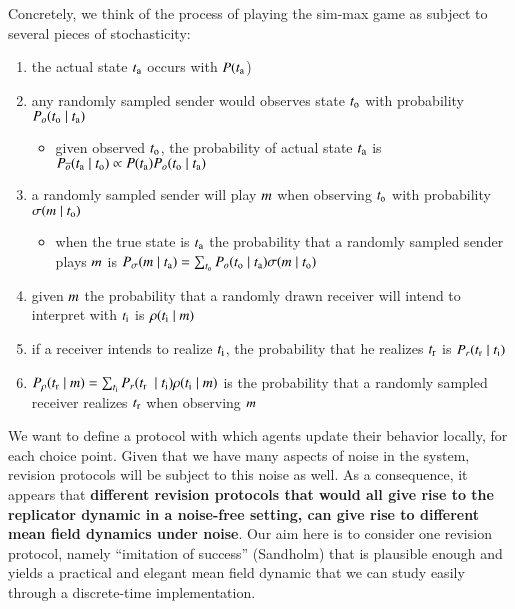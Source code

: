\documentclass[fleqn,reqno,11pt]{article}
\begin{document}
Concretely, we think of the process of playing the sim-max game as subject to several pieces of
stochasticity:
\begin{enumerate}
\item the actual state $t_{\mathrm{a}}$ occurs with $P(t_{\mathrm{a}}$)
\item any randomly sampled sender would observes state $t_{\mathrm{o}}$ with probability
  $P_o(t_{\mathrm{o}} \mid t_{\mathrm{a}})$
  \begin{itemize}
  \item given observed $t_{\mathrm{o}}$, the probability of actual state $t_{\mathrm{a}}$ is
    $P_{\overline{o}}(t_{\mathrm{a}} \mid t_{\mathrm{o}}) \propto P(t_{\mathrm{a}}) P_o(t_{\mathrm{o}}
    \mid t_{\mathrm{a}})$
  \end{itemize}
\item a randomly sampled sender will play $m$ when observing $t_{\mathrm{o}}$ with
  probability $\sigma(m \mid t_{\mathrm{o}})$
  \begin{itemize}
  \item when the true state is $t_{\mathrm{a}}$ the probability that a randomly sampled sender
    plays $m$ is $P_{\sigma}(m \mid t_{\mathrm{a}}) = \sum_{t_{\mathrm{o}}}
    P_o(t_{\mathrm{o}} \mid t_{\mathrm{a}}) \sigma(m \mid t_{\mathrm{o}})$
  \end{itemize}
\item given $m$ the probability that a randomly drawn receiver will intend to interpret
  with $t_{\mathrm{i}}$ is $\rho(t_{\mathrm{i}} \mid m)$
\item if a receiver intends to realize $t_{\mathrm{i}}$, the probability that he realizes
  $t_{\mathrm{r}}$ is $P_r(t_{\mathrm{r}} \mid t_{\mathrm{i}})$
\item $P_{\rho}(t_{\mathrm{r}} \mid m) = \sum_{t_{\mathrm{i}}} P_r(t_{\mathrm{r}} \ \mid
  t_{\mathrm{i}}) \rho(t_{\mathrm{i}} \mid m)$ is the probability that a randomly sampled
  receiver realizes $t_{\mathrm{r}}$ when observing $m$
\end{enumerate}

We want to define a protocol with which agents update their behavior locally, for each choice
point. Given that we have many aspects of noise in the system, revision protocols will be
subject to this noise as well. As a consequence, it appears that \textbf{different revision
  protocols that would all give rise to the replicator dynamic in a noise-free setting, can
  give rise to different mean field dynamics under noise}. Our aim here is to consider one
revision protocol, namely ``imitation of success'' (Sandholm) that is plausible enough and
yields a practical and elegant mean field dynamic that we can study easily through a
discrete-time implementation.
\end{document}
